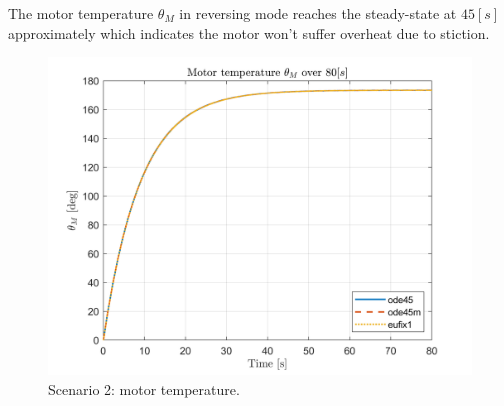 \documentclass[]{article}
\begin{document}
The motor temperature $\theta_M$ in reversing mode reaches the steady-state at $45[s]$ approximately which indicates the motor won't suffer overheat due to stiction. 
\begin{figure}[H]
	\centering
	\includegraphics[width=0.65\linewidth]{sinE0_thetaM_ode45-ode45m-eufix1_1e-4}
	\caption{Scenario 2: motor temperature.}
	\label{fig:Sce2_stiction}
\end{figure}
\end{document}
